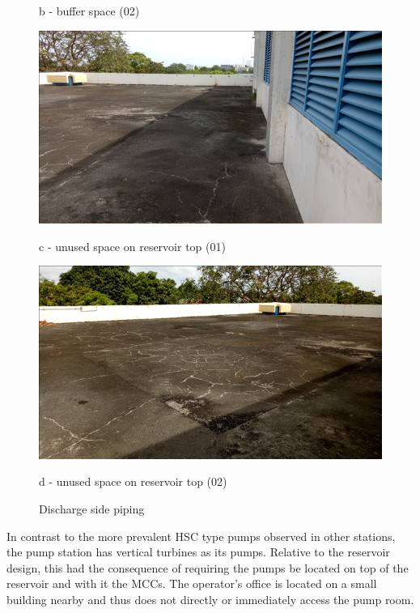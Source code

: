 \begin{figure} [!htb]
\begin{minipage}[b]{0.22\linewidth}
		\caption*{b - buffer space (02) \\}
		\label{ch043_unused_space4}
	\end{minipage}
	\hspace{0.05cm}
	\begin{minipage}[b]{0.22\linewidth}
		\centering
		\includegraphics[width=\textwidth]{figures/fig_ch043_unused_space1}
		\caption*{c - unused space on reservoir top (01)}
		\label{ch043_unused_space1}
	\end{minipage}
	\hspace{0.05cm}
	\begin{minipage}[b]{0.22\linewidth}
		\centering
		\includegraphics[width=\textwidth]{figures/fig_ch043_unused_space2}
		\caption*{d - unused space on reservoir top (02)}
		\label{ch043_unused_space2}
	\end{minipage}
\caption{Discharge side piping}
\label{unused_spaces}
\end{figure}

In contrast to the more prevalent HSC type pumps observed in other stations, the pump station has vertical turbines as its pumps. Relative to the reservoir design, this had the consequence of requiring the pumps be located on top of the reservoir and with it the MCCs. The operator’s office is located on a small building nearby and thus does not directly or immediately access the pump room. 

